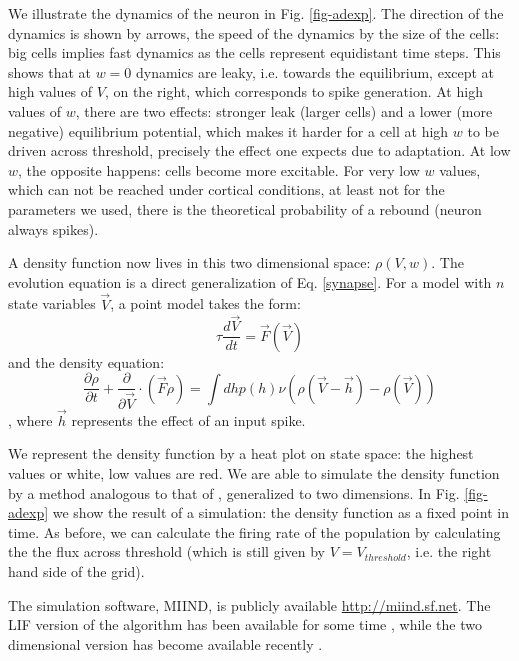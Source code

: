 \documentclass[10pt]{article}
\begin{document}
{We illustrate the dynamics of the neuron in Fig. \ref{fig-adexp}.
The direction of the dynamics is shown by arrows, the speed of the dynamics by the size of the cells:
big cells implies fast dynamics as the cells represent equidistant time steps.
This shows that at $w =0$ dynamics are leaky,  i.e. towards the equilibrium, except at high values of $V$, on the right, which corresponds to spike generation.
At high values of $w$, there are two effects: stronger leak (larger cells) and a lower (more negative) equilibrium potential, which makes it harder for a cell at high $w$ to be driven across threshold, precisely the effect one expects due to adaptation.
At low $w$, the opposite happens: cells become more excitable.
For very low $w$ values, which can not be reached under cortical conditions, at least not for the parameters we used, there is the theoretical probability of a rebound (neuron always spikes).

A density function now lives in this two dimensional space: $\rho(V,w)$.
The evolution equation is a direct generalization of Eq. \ref{synapse}.
For a model with $n$ state variables $\vec{V}$, a point model takes the form:
\begin{equation}
\tau \frac{d \vec{V}}{dt} = \vec{F}(\vec{V})
\end{equation}
and the density equation:
\begin{equation}
\frac{\partial \rho}{\partial t} + \frac{\partial}{\partial \vec{V}} \cdot ( \vec{F} \rho) = \int dh p(h) \nu (\rho(\vec{V} - \vec{h}) -\rho(\vec{V}))
\end{equation},
where $\vec{h}$ represents the effect of an input spike.

We represent the density function by a heat plot on state space: the highest values or white, low values are red.
We are able to simulate the density function by a method analogous to that of \cite{dekamps2013,iyer2013}, generalized to two dimensions.
In Fig. \ref{fig-adexp} we show the result of a simulation: the density function as a fixed point in time.
As before, we can calculate the firing rate of the population by calculating the the flux across threshold (which is still given by $V= V_{threshold}$, i.e. the right hand side of the grid).

The simulation software, MIIND, is publicly available \url{http://miind.sf.net}. The LIF version of the algorithm has been available for some time \cite{dekamps2008}, while the two dimensional version has become available recently \cite{dekamps2017b}.

}
\end{document}
